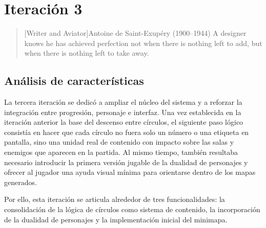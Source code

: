 \chapter{Iteración 3}

\begin{quotation}[Writer and Aviator]{Antoine de Saint-Exupéry (1900--1944)}
A designer knows he has achieved perfection not when there is nothing left to add, but when there is nothing left to take away.
\end{quotation}

\begin{abstract}
Esta iteración amplía la estructura del juego con sistemas que refuerzan la identidad de
la experiencia. Se desarrolla una lógica de contenidos por círculo, se incorpora la
dualidad de personajes y se introduce una primera versión del minimapa como apoyo a la
navegación.
\end{abstract}

\section{Análisis de características}
La tercera iteración se dedicó a ampliar el núcleo del sistema y a reforzar la integración
entre progresión, personaje e interfaz. Una vez establecida en la iteración anterior la
base del descenso entre círculos, el siguiente paso lógico consistía en hacer que cada
círculo no fuera solo un número o una etiqueta en pantalla, sino una unidad real de
contenido con impacto sobre las salas y enemigos que aparecen en la partida. Al mismo
tiempo, también resultaba necesario introducir la primera versión jugable de la dualidad de
personajes y ofrecer al jugador una ayuda visual mínima para orientarse dentro de los mapas
generados.

Por ello, esta iteración se articula alrededor de tres funcionalidades: la consolidación de
la lógica de círculos como sistema de contenido, la incorporación de la dualidad de
personajes y la implementación inicial del minimapa.

